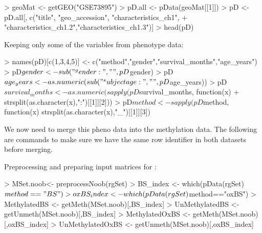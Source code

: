 \documentclass{article}
\begin{document}
\begin{Schunk}
\begin{Sinput}
> geoMat <- getGEO("GSE73895")
> pD.all <- pData(geoMat[[1]])
> pD <- pD.all[, c("title", "geo_accession", "characteristics_ch1",
+                  "characteristics_ch1.2","characteristics_ch1.3")]
> head(pD)
\end{Sinput}
\end{Schunk}

%

Keeping only some of the variables from phenotype data:
\begin{Schunk}
\begin{Sinput}
> names(pD)[c(1,3,4,5)] <- c("method","gender","survival_months","age_years")
> pD$gender <- sub("^gender: ", "", pD$gender)
> pD$age_years <- as.numeric(sub("^subject age: ", "", pD$age_years))
> pD$survival_months <- as.numeric(sapply(pD$survival_months, function(x)
+   strsplit(as.character(x),":")[[1]][2]))
> pD$method <- sapply(pD$method, function(x) strsplit(as.character(x),"_")[[1]][3])
\end{Sinput}
\end{Schunk}

We now need to merge this pheno data into the methylation data. The following are commands to make sure we have the same row identifier in both datasets before merging.

\begin{Schunk}
\end{Schunk}

Preprocessing and preparing input matrices for :
\begin{Schunk}
\begin{Sinput}
> MSet.noob<- preprocessNoob(rgSet)
> BS_index <- which(pData(rgSet)$method=="BS")
> oxBS_index <- which(pData(rgSet)$method=="oxBS")
> MethylatedBS <- getMeth(MSet.noob)[,BS_index]
> UnMethylatedBS <- getUnmeth(MSet.noob)[,BS_index]
> MethylatedOxBS <- getMeth(MSet.noob)[,oxBS_index]
> UnMethylatedOxBS <- getUnmeth(MSet.noob)[,oxBS_index]
\end{Sinput}
\end{Schunk}
\end{document}
